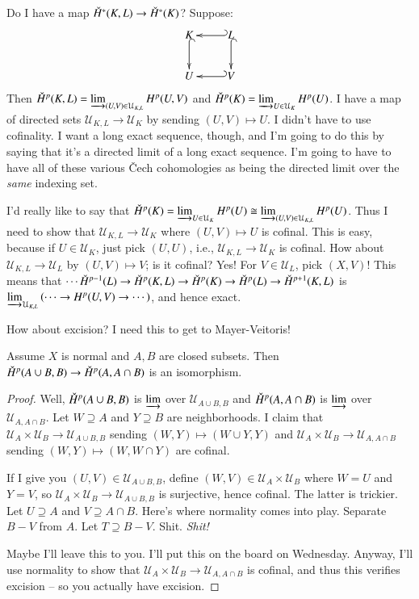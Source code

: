 \begin{example}
Do I have a map $\check{H}^\ast(K,L)\to\check{H}^\ast(K)$? Suppose:
\begin{equation*}
\xymatrix{K\ar@{^(->}[d] & L\ar@{^(->}[d]\ar@{_(->}[l] \\ U & V\ar@{_(->}[l]}
\end{equation*}
Then $\check{H}^p(K,L)=\varinjlim_{(U,V)\in\mathcal{U}_{K,L}}H^p(U,V)$ and $\check{H}^p(K)=\varinjlim_{U\in\mathcal{U}_K}H^p(U)$. I have a map of directed sets $\mathcal{U}_{K,L}\to\mathcal{U}_K$ by sending $(U,V)\mapsto U$. I didn't have to use cofinality. I want a long exact sequence, though, and I'm going to do this by saying that it's a directed limit of a long exact sequence. I'm going to have to have all of these various \v{C}ech cohomologies as being the directed limit over the \emph{same} indexing set.

I'd really like to say that $\check{H}^p(K)=\varinjlim_{U\in\mathcal{U}_K}H^p(U)\cong \varinjlim_{(U,V)\in\mathcal{U}_{K,L}}H^p(U)$. Thus I need to show that $\mathcal{U}_{K,L}\to\mathcal{U}_K$ where $(U,V)\mapsto U$ is cofinal. This is easy, because if $U\in\mathcal{U}_K$, just pick $(U,U)$, i.e., $\mathcal{U}_{K,L}\to\mathcal{U}_K$ is cofinal. How about $\mathcal{U}_{K,L}\to\mathcal{U}_L$ by $(U,V)\mapsto V$; is it cofinal? Yes! For $V\in\mathcal{U}_L$, pick $(X,V)$! This means that $\cdots\check{H}^{p-1}(L)\to\check{H}^p(K,L)\to\check{H}^p(K)\to\check{H}^p(L)\to\check{H}^{p+1}(K,L)$ is $\varinjlim_{\mathcal{U}_{K,L}}\left(\cdots\to H^{p}(U,V)\to\cdots\right)$, and hence exact.
\end{example}
How about excision? I need this to get to Mayer-Veitoris!
\begin{lemma}
Assume $X$ is normal and $A,B$ are closed subsets. Then $\check{H}^p(A\cup B,B)\to\check{H}^p(A,A\cap B)$ is an isomorphism. 
\end{lemma}
\begin{proof}
Well, $\check{H}^p(A\cup B,B)$ is $\varinjlim$ over $\mathcal{U}_{A\cup B,B}$ and $\check{H}^p(A,A\cap B)$ is $\varinjlim$ over $\mathcal{U}_{A,A\cap B}$. Let $W\supseteq A$ and $Y\supseteq B$ are neighborhoods. I claim that $\mathcal{U}_A\times\mathcal{U}_B\to\mathcal{U}_{A\cup B,B}$ sending $(W,Y)\mapsto (W\cup Y,Y)$ and $\mathcal{U}_A\times\mathcal{U}_B\to\mathcal{U}_{A,A\cap B}$ sending $(W,Y)\mapsto (W,W\cap Y)$ are cofinal.

If I give you $(U,V)\in \mathcal{U}_{A\cup B,B}$, define $(W,V)\in\mathcal{U}_A\times\mathcal{U}_B$ where $W=U$ and $Y=V$, so $\mathcal{U}_A\times\mathcal{U}_B\to\mathcal{U}_{A\cup B,B}$ is surjective, hence cofinal. The latter is trickier. Let $U\supseteq A$ and $V\supseteq A\cap B$. Here's where normality comes into play. Separate $B-V$ from $A$. Let $T\supseteq B-V$. Shit. \emph{Shit!}

Maybe I'll leave this to you. I'll put this on the board on Wednesday. Anyway, I'll use normality to show that $\mathcal{U}_A\times\mathcal{U}_B\to\mathcal{U}_{A,A\cap B}$ is cofinal, and thus this verifies excision -- so you actually have excision.
\end{proof}
